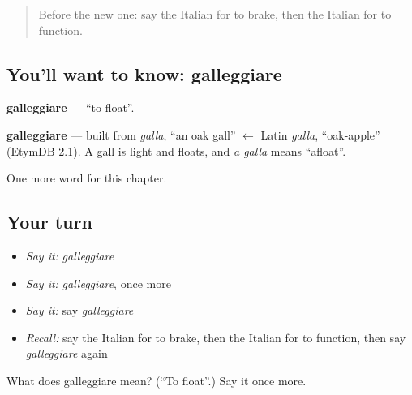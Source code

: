 \begin{quote}
Before the new one: say the Italian for to brake, then the Italian for to function.
\end{quote}

\subsection*{You'll want to know: galleggiare}
\textbf{galleggiare} — \textquotedblleft{}to float\textquotedblright{}.

\begin{cousinweb}
\textbf{galleggiare} — built from \emph{galla}, \textquotedblleft{}an oak gall\textquotedblright{} $\leftarrow$ Latin \emph{galla}, \textquotedblleft{}oak-apple\textquotedblright{} (EtymDB 2.1). A gall is light and floats, and \emph{a galla} means \textquotedblleft{}afloat\textquotedblright{}.
\end{cousinweb}

\begin{grammarlens}[title={What you've built}]
One more word for this chapter.
\end{grammarlens}

\subsection*{Your turn}
\begin{itemize}
\raggedright
  \item \emph{Say it:} \emph{galleggiare}
  \item \emph{Say it:} \emph{galleggiare}, once more
  \item \emph{Say it:} say \emph{galleggiare}
  \item \emph{Recall:} say the Italian for to brake, then the Italian for to function, then say \emph{galleggiare} again
\end{itemize}

\begin{tcolorbox}[breakable,colback=teal!4,colframe=teal!35!black,title={Before you move on}]
What does galleggiare mean? (\textquotedblleft{}To float\textquotedblright{}.) Say it once more.
\end{tcolorbox}
